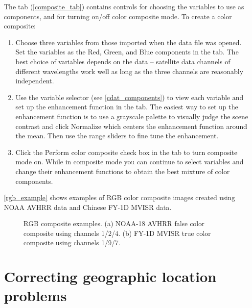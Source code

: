 The  tab
(\autoref{composite_tab}) contains controls for choosing the
variables to use as components, and for turning on/off color
composite mode.  To create a color composite:
\begin{enumerate}

\item Choose three variables from those imported when the data
file was opened.  Set the variables as the {\gui Red},
{\gui Green}, and {\gui Blue} components in the
 tab.  The best choice of
variables depends on the data -- satellite data channels of
different wavelengths work well as long as the three channels are
reasonably independent.

\item Use the variable selector (see \autoref{cdat_components})
to view each variable and set up the enhancement function in the
 tab.  The easiest way to
set up the enhancement function is to use a grayscale palette to
visually judge the scene contrast and click {\gui Normalize} which
centers the enhancement function around the mean.  Then use the
range sliders to fine tune the enhancement.

\item Click the {\gui Perform color composite} check box in the
 tab to turn composite mode on.
While in composite mode you can continue to select variables and
change their enhancement functions to obtain the best mixture of
color components.

\end{enumerate}

\autoref{rgb_example} shows examples of RGB color composite
images created using NOAA AVHRR data and Chinese FY-1D MVISR
data.

\begin{figure}
  \begin{center}
    \caption[RGB composite examples]{
       RGB composite examples.  (a) NOAA-18 AVHRR false color
       composite using channels 1/2/4.  (b) FY-1D MVISR true
       color composite using channels 1/9/7.
    }
    \label{rgb_example}
  \end{center}
\end{figure}

\section{Correcting geographic location problems}

